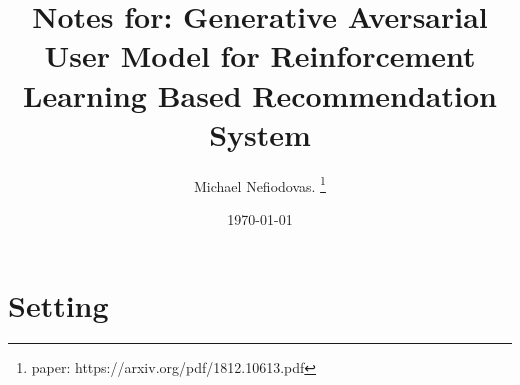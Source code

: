 \documentclass{article}
\title{Notes for: Generative Aversarial User Model for Reinforcement Learning Based Recommendation System}
\author{Michael Nefiodovas. \thanks{paper: https://arxiv.org/pdf/1812.10613.pdf}}
\date{\today}
\begin{document}
    \maketitle

    \section{Setting}
\end{document}
